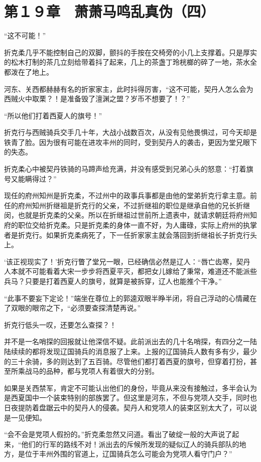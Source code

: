 \section{第１９章　萧萧马鸣乱真伪（四）}

“这不可能！”

折克柔几乎不能控制自己的双脚，颤抖的手按在交椅旁的小几上支撑着。只是厚实的松木打制的茶几立刻给带着抖了起来，几上的茶盏丁玲桄榔的碎了一地，茶水全都泼在了地上。

河东、关西都赫赫有名的折家家主，此时抖得厉害，“这不可能，契丹人怎么会为西贼火中取栗？！是准备毁了澶渊之盟？岁币不想要了！？”

“所以他们打着西夏人的旗号！”

折克行与西贼骑兵交手几十年，大战小战数百次，从没有见他畏惧过，可今天却是铁青了脸。因为很有可能在进攻丰州的同时，受到契丹人的袭击，更因为堂兄眼下的失态。

折克柔心中被契丹铁骑的马蹄声给充满，并没有感受到兄弟心头的怒意：“打着旗号又能瞒得过？”

现任的府州知州是折克柔，不过州中的政事兵事都是由他的堂弟折克行拿主意。前任的府州知州折继祖是折克行的父亲，不过折继祖的职位是继承自他的兄长折继闵，也就是折克柔的父亲。所以在折继祖过世前所上遗表中，就请求朝廷将府州知府的职位交给折克柔。只是折克柔的身体一直不好，为人庸碌，实际上府州的执掌者是折克行。如果折克柔病死了，下一任折家家主就会落回到折继祖长子折克行头上。

‘该正视现实了！’折克行瞥了堂兄一眼，已经确信必然是辽人：“唇亡齿寒，契丹人本就不可能看着大宋一步步将西夏平灭，都把女儿嫁给了秉常，难道还不能派些兵马？只要是打着西夏人的旗号，就算是被拆穿，辽人也能推个干净。”

“此事不要妄下定论！”端坐在尊位上的郭逵双眼半睁半闭，将自己浮动的心情藏在了双眼的眼帘之下，“必须要查探清楚再说。”

折克行低头一叹，还要怎么查探？！

并不是一名哨探的回报就让他深信不疑。此前派出去的几十名哨探，有四分之一陆陆续续的都将发现辽国骑兵的消息报了上来。上报的辽国骑兵人数有多有少，最少的三十余骑，多的则达到了五百骑。尽管他们都打着西夏的旗号，但穿着打扮，甚至所乘战马的品种，都与党项人有着很大的分别。

如果是关西禁军，肯定不可能认出他们的身份，毕竟从来没有接触过，多半会认为是西夏国中一个装束特别的部族罢了。但这里是河东，不但与党项人交手，同时也日夜提防着盘踞云中的契丹人的侵袭。契丹人和党项人的装束区别太大了，可以说是一见便知。

“会不会是党项人假扮的。”折克柔忽然又问道。看出了破绽一般的大声说了起来，“他们的行军的路线不对！派出去的斥候所发现的疑似辽人的骑兵部队的地方，是位于丰州外围的官道上，辽国骑兵怎么可能会为党项人看守门户？”

